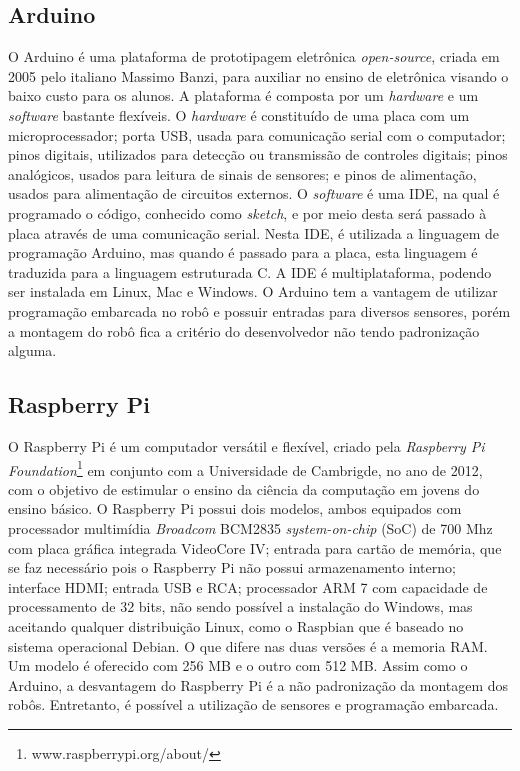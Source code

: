 \subsection{Arduino}
O Arduino é uma plataforma de prototipagem eletrônica \textit{open-source}, criada em 2005 pelo italiano Massimo Banzi, para auxiliar no ensino de eletrônica visando o baixo custo para os alunos. A plataforma é composta por um \textit{hardware} e um \textit{software} bastante flexíveis. 
O \textit{hardware} é constituído de uma placa com um microprocessador; porta USB, usada para comunicação serial com o computador; pinos digitais, utilizados para detecção ou transmissão de controles digitais; pinos analógicos, usados para leitura de sinais de sensores; e pinos de alimentação, usados para alimentação de circuitos externos. 
O \textit{software} é uma IDE, na qual é programado o código, conhecido como \textit{sketch}, e por meio desta será passado à placa através de uma comunicação serial. Nesta IDE, é utilizada a linguagem de programação Arduino, mas quando é passado para a placa, esta linguagem é traduzida para a linguagem estruturada C. A IDE é multiplataforma, podendo ser instalada em Linux, Mac e Windows.
O Arduino tem a vantagem de utilizar programação embarcada no robô e possuir entradas para diversos sensores, porém a montagem do robô fica a critério do desenvolvedor não tendo padronização alguma.

\subsection{Raspberry Pi}
O Raspberry Pi é um computador versátil e flexível, criado pela \textit{Raspberry Pi Foundation}\footnote{www.raspberrypi.org/about/} em conjunto com a Universidade de Cambrigde, no ano de 2012, com o objetivo de estimular o ensino da ciência da computação em jovens do ensino básico.
O Raspberry Pi possui dois modelos, ambos equipados com processador multimídia \textit{Broadcom} BCM2835 \textit{system-on-chip} (SoC) de 700 Mhz com placa gráfica integrada VideoCore IV; entrada para cartão de memória, que se faz necessário pois o Raspberry Pi não possui armazenamento interno; interface HDMI; entrada USB e RCA; processador ARM 7 com capacidade de processamento de 32 bits, não sendo possível a instalação do Windows, mas aceitando qualquer distribuição Linux, como o Raspbian que é baseado no sistema operacional Debian. O que difere nas duas versões é a memoria RAM. Um modelo é oferecido com 256 MB e o outro com 512 MB.
Assim como o Arduino, a desvantagem do Raspberry Pi é a não padronização da montagem dos robôs. Entretanto, é possível a utilização de sensores e programação embarcada.

